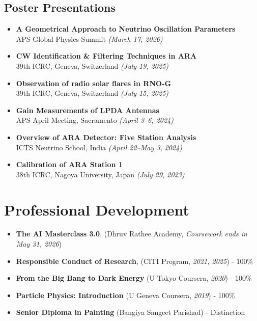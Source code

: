 \documentclass[10pt]{report}
\begin{document}
\subsection*{Poster Presentations}
\begin{itemize}

    \item \textbf{A Geometrical Approach to Neutrino Oscillation Parameters} \\
    APS Global Physics Summit \textit{(March 17, 2026)}
    
    \item \textbf{CW Identification \& Filtering Techniques in ARA} \\
    39th ICRC, Geneva, Switzerland \textit{(July 19, 2025)}
    
    \item \textbf{Observation of radio solar flares in RNO-G} \\
    39th ICRC, Geneva, Switzerland \textit{(July 15, 2025)}
    
    \item \textbf{Gain Measurements of LPDA Antennas} \\
    APS April Meeting, Sacramento \textit{(April 3--6, 2024)}
    
    \item \textbf{Overview of ARA Detector: Five Station Analysis} \\
    ICTS Neutrino School, India \textit{(April 22--May 3, 2024)}
    
    \item \textbf{Calibration of ARA Station 1} \\
    38th ICRC, Nagoya University, Japan \textit{(July 29, 2023)}
    
\end{itemize}

\section*{Professional Development}
\begin{itemize}
    \item \textbf{The AI Masterclass 3.0}, (Dhruv Rathee Academy, \textit{Coursework ends in May 31, 2026})  
    \item \textbf{Responsible Conduct of Research}, (CITI Program, \textit{2021, 2025}) - 100\%
    \item \textbf{From the Big Bang to Dark Energy} (U Tokyo Coursera, \textit{2020}) - 100\%
    \item \textbf{Particle Physics: Introduction} (U Geneva Coursera, \textit{2019}) - 100\%
    \item \textbf{Senior Diploma in Painting} (Bangiya Sangeet Parishad) - Distinction
\end{itemize}

\newpage


\end{document}
